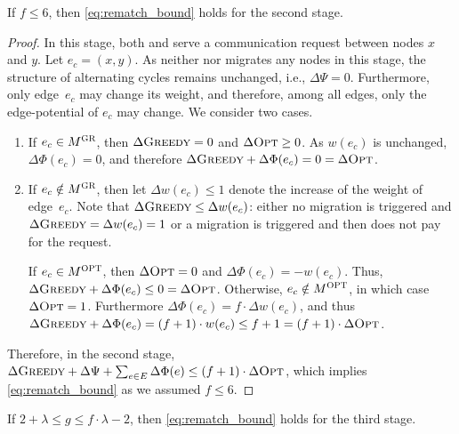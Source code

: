 \begin{lemma}
\label{lem:rematch_req}
If $f \leq 6$, then \eqref{eq:rematch_bound} holds for the second stage.
\end{lemma}

\begin{proof}
In this stage, both \GREEDY and \OPT serve a communication request between
nodes $x$ and $y$. Let $e_c = (x,y)$. As neither \GREEDY nor \OPT migrates any
nodes in this stage, the structure of alternating cycles remains
unchanged, i.e., $\Delta \Psi = 0$. Furthermore, only edge~$e_c$ may change its
weight, and therefore, among all edges, only the edge-potential of $e_c$ may
change. We consider two cases.
\begin{enumerate}

\item If $e_c \in M^\textsc{GR}$, then $\Delta \textsc{Greedy} = 0$ and $\Delta \textsc{Opt} \geq 0$. As
$w(e_c)$ is unchanged, $\Delta \Phi(e_c) = 0$, and therefore 
$\Delta \textsc{Greedy} + \Delta \Phi(e_c) = 0 = \Delta \textsc{Opt}$. 

\item If $e_c \notin M^\textsc{GR}$, then let $\Delta w(e_c) \leq 1$ denote the increase 
of the weight of edge~$e_c$. Note that $\Delta \textsc{Greedy} \leq \Delta w(e_c)$: 
either no migration is triggered and $\Delta \textsc{Greedy} = \Delta w(e_c) = 1$
or a migration is triggered and then \GREEDY does not pay for the request.

If $e_c \in M^\textsc{OPT}$, then $\Delta \textsc{Opt} = 0$ and $\Delta \Phi(e_c) = -w(e_c)$.
Thus, $\Delta \textsc{Greedy} + \Delta \Phi(e_c) \leq 0 = \Delta \textsc{Opt}$. Otherwise, 
$e_c \notin M^\textsc{OPT}$, in which case 
$\Delta \textsc{Opt} = 1$. Furthermore $\Delta \Phi(e_c) = f \cdot \Delta w(e_c)$,
and thus $\Delta \textsc{Greedy} + \Delta \Phi(e_c) = (f+1) \cdot w(e_c) \leq f+1 =
(f+1) \cdot \Delta \textsc{Opt}$.
\end{enumerate}

Therefore, in the second stage, $\Delta \textsc{Greedy} + \Delta \Psi + \sum_{e \in E}
\Delta \Phi(e) \leq (f+1) \cdot \Delta \textsc{Opt}$,
which implies \eqref{eq:rematch_bound} as we assumed $f \leq 6$.
\end{proof}


\begin{lemma}
\label{lem:greedy_swap}
If $2 + \lambda \leq g \leq f \cdot \lambda - 2$, 
then  \eqref{eq:rematch_bound} holds for the third stage.
\end{lemma}



